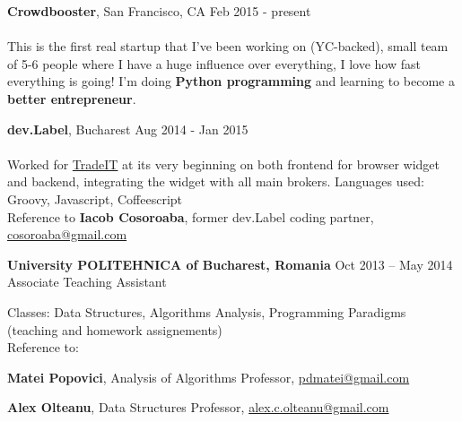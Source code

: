 \documentclass[margin,line]{resume}
\begin{document}
\begin{resume}
    \vspace{1.2mm}\textbf{Crowdbooster}, San Francisco, CA
        \hfill Feb 2015 - present\vspace{1mm}\\
    \selectfont{Software Developer}\vspace{1.2mm}\\
    {\fontsize{2.65mm}{1em}\selectfont
     This is the first real startup that I've been working on (YC-backed), small team of 5-6 people where I have a huge influence over everything, I love how fast everything is going! I'm doing \textbf{Python programming} and learning to become a \textbf{better entrepreneur}.
    }

    \vspace{1.2mm}\textbf{dev.Label}, Bucharest
        \hfill Aug 2014 - Jan 2015\vspace{1mm}\\
    \selectfont{Frontend \& Backend Developer}\vspace{1.2mm}\\
    {\fontsize{2.65mm}{1em}\selectfont
      Worked for \href{https://www.trade.it/}{TradeIT} at its very beginning on both frontend for browser widget and backend, integrating the widget with all main brokers.
      Languages used: Groovy, Javascript, Coffeescript\\
      Reference to \textbf{Iacob Cosoroaba}, former dev.Label coding partner, \href{mailto:cosoroaba@gmail.com}{cosoroaba@gmail.com}
     }

    \vspace{1.2mm}\textbf{University POLITEHNICA of Bucharest, Romania}
        \hfill Oct 2013 -- May 2014\vspace{1mm}\\
        Associate Teaching Assistant\vspace{1.2mm}\\
    {\fontsize{2.65mm}{1em}\selectfont
      Classes: Data Structures, Algorithms Analysis, Programming Paradigms (teaching and homework assignements)\\
      Reference to:
      \begin{list2}
          \item \textbf{Matei Popovici}, Analysis of Algorithms Professor, \href{mailto:pdmatei@gmail.com}{pdmatei@gmail.com}
          \item \textbf{Alex Olteanu}, Data Structures Professor, \href{mailto:alex.c.olteanu@gmail.com}{alex.c.olteanu@gmail.com}
      \end{list2}
    }


\end{resume}
\end{document}
